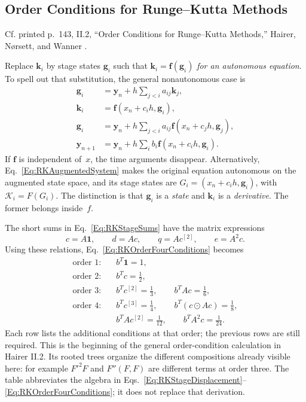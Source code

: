\subsection{Order Conditions for Runge--Kutta Methods}

Cf. printed p.~143, II.2, ``Order Conditions for Runge--Kutta Methods,''
Hairer, N\o rsett, and Wanner \cite{HNW1993}.

Replace $\mathbf k_i$ by stage states $\mathbf g_i$ such that
$\mathbf k_i=\mathbf f(\mathbf g_i)$ \emph{for an autonomous equation}.
To spell out that substitution, the general nonautonomous case is
\begin{equation}\label{Eq:RKGeneralStageStates}
\begin{aligned}
 \mathbf g_i&=\mathbf y_n+h\sum_{j<i}a_{ij}\mathbf k_j,\\
 \mathbf k_i&=\mathbf f(x_n+c_ih,\mathbf g_i),\\
 \mathbf g_i&=\mathbf y_n+h\sum_{j<i}a_{ij}
                            \mathbf f(x_n+c_jh,\mathbf g_j),\\
 \mathbf y_{n+1}&=\mathbf y_n+h\sum_i b_i
                            \mathbf f(x_n+c_ih,\mathbf g_i).
\end{aligned}
\end{equation}
If $\mathbf f$ is independent of~$x$, the time arguments disappear.
Alternatively, Eq.~\ref{Eq:RKAugmentedSystem} makes the original equation
autonomous on the augmented state space, and its stage states are
$G_i=(x_n+c_ih,\mathbf g_i)$, with $\mathcal K_i=F(G_i)$.
The distinction is that $\mathbf g_i$ is a \emph{state} and
$\mathbf k_i$ is a \emph{derivative}. The former belongs inside~$f$.

The short sums in Eq.~\ref{Eq:RKStageSums} have the matrix expressions
\begin{equation}\label{Eq:RKOrderSumsMatrix}
 c=A\mathbf1,\qquad d=Ac,\qquad q=Ac^{[2]},\qquad e=A^2c.
\end{equation}
Using these relations, Eq.~\ref{Eq:RKOrderFourConditions} becomes
\begin{equation}\label{Eq:RKOrderConditionsMatrix}
\begin{aligned}
 \text{order 1:}\quad &b^T\mathbf1=1,\\
 \text{order 2:}\quad &b^Tc=\tfrac12,\\
 \text{order 3:}\quad &b^Tc^{[2]}=\tfrac13,\qquad b^TAc=\tfrac16,\\
 \text{order 4:}\quad &b^Tc^{[3]}=\tfrac14,\qquad b^T(c\odot Ac)=\tfrac18,\\
                     &b^TAc^{[2]}=\tfrac1{12},\qquad b^TA^2c=\tfrac1{24}.
\end{aligned}
\end{equation}
Each row lists the additional conditions at that order; the previous rows
are still required. This is the beginning of the general order-condition
calculation in Hairer II.2. Its rooted trees organize the different
compositions already visible here: for example $F'^2F$ and $F''(F,F)$
are different terms at order three. The table abbreviates the algebra in
Eqs.~\ref{Eq:RKStageDisplacement}--\ref{Eq:RKOrderFourConditions}; it does
not replace that derivation.


